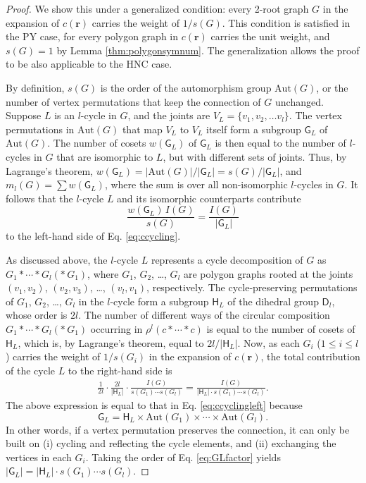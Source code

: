 \documentclass[preprint]{revtex4-1}
\newcommand{\vct}[1]{\mathbf{#1}}
\providecommand{\vr}{} %
\renewcommand{\vr}{\vct{r}}
\newcommand{\G}{\mathsf{G}}
\newcommand{\D}{\mathsf{D}}
\newcommand{\Hgroup}{\mathsf{H}}
\newcommand{\Aut}{\mathrm{Aut}}
\begin{document}
\begin{proof}
We show this under a generalized condition:
every 2-root graph $G$ in the expansion of $c(\vr)$
carries the weight of $1/s(G)$.
%
This condition is satisfied in the PY case,
for every polygon graph in $c(\vr)$
carries the unit weight,
and $s(G) = 1$ by Lemma \ref{thm:polygonsymnum}.
%
The generalization
allows the proof to be also applicable to the HNC case. %


By definition,
$s(G)$ is the order of the automorphism group $\Aut(G)$,
or the number of vertex permutations
that keep the connection of $G$ unchanged.
%
Suppose $L$ is an $l$-cycle in $G$,
and the joints are $V_L = \{v_1, v_2, \dots v_l\}$.
%
The vertex permutations in $\Aut(G)$ that
map $V_L$ to $V_L$ itself %
form a subgroup $\G_L$ of $\Aut(G)$.
%
The number of cosets $w(\G_L)$ of $\G_L$
is then equal to the number of $l$-cycles in $G$
that are isomorphic to $L$,
but with different sets of joints.
%
Thus, by Lagrange's theorem,
$w(\G_L) = |\Aut(G)|/|\G_L| = s(G)/|\G_L|$,
%
and
$m_l(G) = \sum w(\G_L)$,
where the sum is over all non-isomorphic $l$-cycles in $G$.
%
It follows that the $l$-cycle $L$
and its isomorphic counterparts
contribute
\begin{equation}
  \frac{ w(\G_L) \, I(G) }{ s(G) }
= \frac{ I(G) }{ |\G_L|}
\label{eq:ccyclingleft}
\end{equation}
to the left-hand side of Eq. \eqref{eq:ccycling}.


As discussed above,
the $l$-cycle $L$ represents a cycle decomposition of $G$
as $G_1 * \cdots * G_l (* \, G_1)$,
where $G_1$, $G_2$, \dots, $G_l$ are polygon graphs
rooted at the joints
$(v_1, v_2)$, $(v_2, v_3)$, \dots, $(v_l, v_1)$, respectively.
%
The cycle-preserving permutations of $G_1$, $G_2$, \dots, $G_l$ in the $l$-cycle
form a subgroup $\Hgroup_L$ of the dihedral group $\D_l$,
whose order is $2l$.
%
The number of different ways of the circular composition
$G_1 * \cdots * G_l (*\, G_1)$
occurring in $\rho^l (c * \cdots * c)$ is equal to
the number of cosets of $\Hgroup_L$,
which is, by Lagrange's theorem, equal to
$2l / |\Hgroup_L|$.
%
Now, as each $G_i$ ($1 \le i \le l$)
carries the weight of $1/s(G_i)$ in the expansion of $c(\vr)$,
the total contribution of the cycle $L$
to the right-hand side is
\begin{align*}
  \frac{1}{2l}
  \cdot
  \frac{2l}{|\Hgroup_L|}
  \cdot
  \frac{I(G)}{ s(G_1) \cdots s(G_l)}
= \frac{ I(G) }
 { |\Hgroup_L| \cdot s(G_1) \cdots s(G_l) }.
\end{align*}
The above expression is equal to that in Eq. \eqref{eq:ccyclingleft}
because
\begin{equation}
  \G_L = \Hgroup_L \times \Aut(G_1) \times \cdots \times \Aut(G_l).
  \label{eq:GLfactor}
\end{equation}
%
In other words,
if a vertex permutation preserves the connection,
it can only be built on
(i) cycling and reflecting the cycle elements, and
(ii) exchanging the vertices in each $G_i$.
Taking the order of Eq. \eqref{eq:GLfactor} yields
$|\G_L| = |\Hgroup_L| \cdot s(G_1) \cdots s(G_l)$.
\end{proof}
\end{document}
